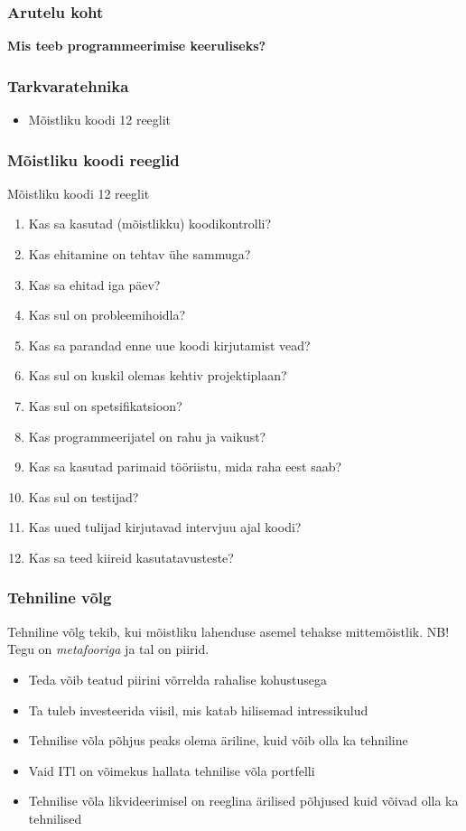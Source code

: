 \begin{frame}[fragile]
  \frametitle{Arutelu koht}
		\begin{center}
			\textbf{Mis teeb programmeerimise keeruliseks?}
		\end{center}
\end{frame}

\begin{frame}[fragile]
  \frametitle{Tarkvaratehnika}
	\begin{itemize}
		\item Mõistliku koodi 12 reeglit \cite{spolsky2004joel}
	\end{itemize}
\end{frame}

\begin{frame}[fragile]
  \frametitle{Mõistliku koodi reeglid}
  Mõistliku koodi 12 reeglit \cite{spolsky2004joel}
\small  
	\begin{enumerate}
		\item Kas sa kasutad (mõistlikku) koodikontrolli?
		\item Kas ehitamine on tehtav ühe sammuga?
		\item Kas sa ehitad iga päev?
		\item Kas sul on probleemihoidla?
		\item Kas sa parandad enne uue koodi kirjutamist vead?
		\item Kas sul on kuskil olemas kehtiv projektiplaan?
		\item Kas sul on spetsifikatsioon?
		\item Kas programmeerijatel on rahu ja vaikust?
		\item Kas sa kasutad parimaid tööriistu, mida raha eest saab?
		\item Kas sul on testijad?
		\item Kas uued tulijad kirjutavad intervjuu ajal koodi?
		\item Kas sa teed kiireid kasutatavusteste?
	\end{enumerate}
\normalsize
\end{frame}


\begin{frame}[fragile]
  \frametitle{Tehniline võlg}
	Tehniline võlg tekib, kui mõistliku lahenduse asemel tehakse mittemõistlik. NB! Tegu on \emph{metafooriga} ja tal on piirid.
  \begin{itemize}
	\item Teda võib teatud piirini võrrelda rahalise kohustusega
	\item Ta tuleb investeerida viisil, mis katab hilisemad intressikulud
	\item Tehnilise võla põhjus peaks olema äriline, kuid võib olla ka tehniline 
	\item Vaid ITl on võimekus hallata tehnilise võla portfelli
	\item Tehnilise võla likvideerimisel on reeglina ärilised põhjused kuid võivad olla ka tehnilised
  \end{itemize}

\end{frame}

